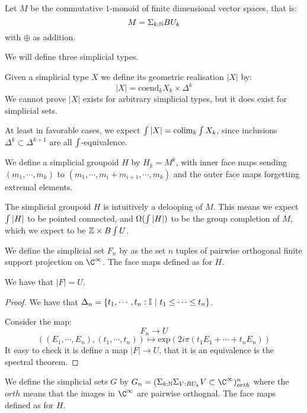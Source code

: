 
\begin{definition}
Let $M$ be the commutative $1$-monoid of finite dimensional vector spaces, that is:
\[M = \Sigma_{k:\mathbb{N}} BU_k\]
with $\oplus$ as addition.
\end{definition}

We will define three simplicial types. 

\begin{remark}
Given a simplicial type $X$ we define its geometric realisation $|X|$ by:
\[|X| = \mathrm{coend}_k X_k\times\Delta^k\]
We cannot prove $|X|$ exists for arbitrary simplicial types, but it does exist for simplicial sets.

At least in favorable cases, we expect $\int |X| = \mathrm{colim}_k \int X_k$, since inclusions $\Delta^k \subset \Delta^{k+1}$ are all $\int$-equivalence.
\end{remark}

\begin{definition}
We define a simplicial groupoid $H$ by $H_k = M^k$, with inner face maps sending $(m_1,\cdots,m_k)$ to $(m_1,\cdots,m_i+m_{i+1},\cdots,m_k)$ and the outer face maps forgetting extremal elements.
\end{definition}

The simplicial groupoid $H$ is intuitively a delooping of $M$. This means we expect $\int |H|$ to be pointed connected, and $\Omega(\int |H|)$ to be the group completion of $M$, which we expect to be $\mathbb{Z}\times B\int U$. 

\begin{definition}
We define the simplicial set $F_n$ by as the set $n$ tuples of pairwise orthogonal finite support projection on $\C^\infty$. The face maps defined as for $H$.
\end{definition}

\begin{proposition}
We have that $|F| = U$.
\end{proposition}

\begin{proof}
We have that $\Delta_n = \{t_1,\cdots,t_n:\mathbb{I}\ |\ t_1\leq \cdots\leq t_n\}$.

Consider the map:
\[F_n\to U\] 
\[((E_1,\cdots,E_n),(t_1,\cdots,t_n)) \mapsto \mathrm{exp}(2i\pi(t_1E_1+\cdots+t_nE_n))\]
It easy to check it is define a map $|F|\to U$, that it is an equivalence is the spectral theorem.
\end{proof}

\begin{definition}
We define the simplicial sets $G$ by $G_n = (\Sigma_{k:\N}\Sigma_{V:BU_k}V\subset \C^\infty)^n_{orth}$ where the $orth$ means that the images in $\C^\infty$ are pairwise orthognal. The face maps defined as for $H$.
\end{definition}

